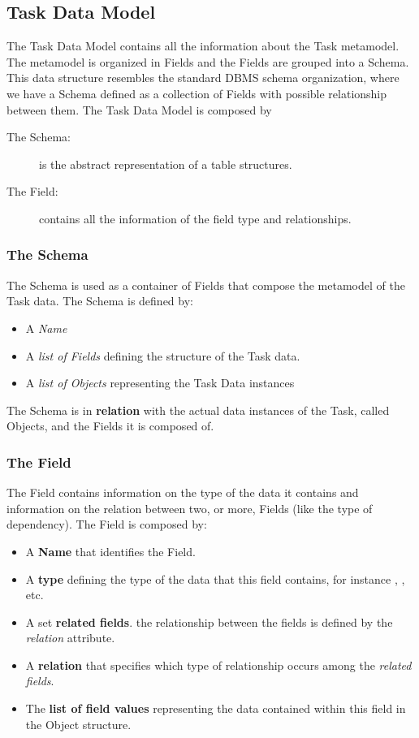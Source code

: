 \subsection{Task Data Model}
The Task Data Model contains all the information about the Task metamodel. The
metamodel is organized in Fields and the Fields are grouped into a Schema. This
data structure resembles the standard DBMS schema organization, where we have
a Schema defined as a collection of Fields with possible relationship between
them. The Task Data Model is composed by
\begin{description}
    \item[The Schema:] is the abstract representation of a table structures.
    \item[The Field:] contains all the information of the field type and
    relationships.
\end{description}


\subsubsection{The Schema}
The Schema is used as a container of Fields that compose the metamodel of the
Task data. The Schema is defined by:
\begin{itemize}
    \item A \emph{Name}

    \item A \emph{list of Fields} defining the structure of the Task data.

    \item A \emph{list of Objects} representing the Task Data instances
\end{itemize}

The Schema is in \textbf{relation} with the actual data instances of the Task,
called Objects, and the Fields it is composed of.


\subsubsection{The Field}
The Field contains information on the type of the data it contains and information
on the relation between two, or more, Fields (like the type of dependency).
The Field is composed by:
\begin{itemize}
    \item A \textbf{Name} that identifies the Field.
    
    \item A \textbf{type} defining the type of the data that this field contains,
    for instance , , etc.

    \item A set \textbf{related fields}. the relationship between the fields
    is defined by the \emph{relation} attribute.
    
    \item A \textbf{relation} that specifies which type of relationship occurs
    among the \emph{related fields}.

    \item The \textbf{list of field values} representing the data contained within
    this field in the Object structure.
\end{itemize}

